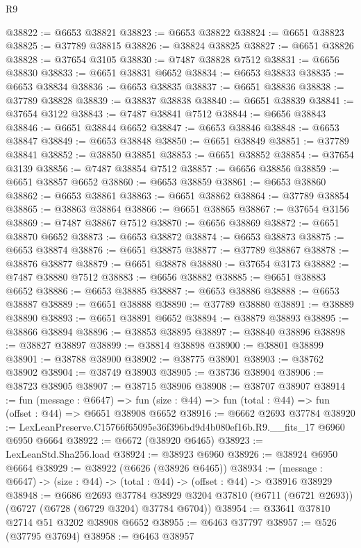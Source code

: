 \begin{lexlean}{R9}
\begin{coremodule}
@38822 := @6653 @38821
@38823 := @6653 @38822
@38824 := @6651 @38823
@38825 := @37789 @38815
@38826 := @38824 @38825
@38827 := @6651 @38826
@38828 := @37654 @3105
@38830 := @7487 @38828 @7512
@38831 := @6656 @38830
@38833 := @6651 @38831 @6652
@38834 := @6653 @38833
@38835 := @6653 @38834
@38836 := @6653 @38835
@38837 := @6651 @38836
@38838 := @37789 @38828
@38839 := @38837 @38838
@38840 := @6651 @38839
@38841 := @37654 @3122
@38843 := @7487 @38841 @7512
@38844 := @6656 @38843
@38846 := @6651 @38844 @6652
@38847 := @6653 @38846
@38848 := @6653 @38847
@38849 := @6653 @38848
@38850 := @6651 @38849
@38851 := @37789 @38841
@38852 := @38850 @38851
@38853 := @6651 @38852
@38854 := @37654 @3139
@38856 := @7487 @38854 @7512
@38857 := @6656 @38856
@38859 := @6651 @38857 @6652
@38860 := @6653 @38859
@38861 := @6653 @38860
@38862 := @6653 @38861
@38863 := @6651 @38862
@38864 := @37789 @38854
@38865 := @38863 @38864
@38866 := @6651 @38865
@38867 := @37654 @3156
@38869 := @7487 @38867 @7512
@38870 := @6656 @38869
@38872 := @6651 @38870 @6652
@38873 := @6653 @38872
@38874 := @6653 @38873
@38875 := @6653 @38874
@38876 := @6651 @38875
@38877 := @37789 @38867
@38878 := @38876 @38877
@38879 := @6651 @38878
@38880 := @37654 @3173
@38882 := @7487 @38880 @7512
@38883 := @6656 @38882
@38885 := @6651 @38883 @6652
@38886 := @6653 @38885
@38887 := @6653 @38886
@38888 := @6653 @38887
@38889 := @6651 @38888
@38890 := @37789 @38880
@38891 := @38889 @38890
@38893 := @6651 @38891 @6652
@38894 := @38879 @38893
@38895 := @38866 @38894
@38896 := @38853 @38895
@38897 := @38840 @38896
@38898 := @38827 @38897
@38899 := @38814 @38898
@38900 := @38801 @38899
@38901 := @38788 @38900
@38902 := @38775 @38901
@38903 := @38762 @38902
@38904 := @38749 @38903
@38905 := @38736 @38904
@38906 := @38723 @38905
@38907 := @38715 @38906
@38908 := @38707 @38907
@38914 := fun (message : @6647) =>
  fun (size : @44) => fun (total : @44) => fun (offset : @44) => @6651 @38908 @6652
@38916 := @6662 @2693 @37784
@38920 := LexLeanPreserve.C15766f65095e36f396bd9d4b080ef16b.R9.__fits_17 @6960 @6950 @6664
@38922 := @6672 (@38920 @6465)
@38923 := LexLeanStd.Sha256.load
@38924 := @38923 @6960
@38926 := @38924 @6950 @6664
@38929 := @38922 (@6626 (@38926 @6465))
@38934 := (message : @6647) -> (size : @44) -> (total : @44) -> (offset : @44) -> @38916 @38929
@38948 := @6686
    @2693
    @37784
    @38929
    @3204
    @37810
    (@6711 (@6721 @2693))
    (@6727 (@6728 (@6729 @3204) @37784 @6704))
@38954 := @33641 @37810 @2714 @51 @3202 @38908 @6652
@38955 := @6463 @37797
@38957 := @526 (@37795 @37694)
@38958 := @6463 @38957

\end{coremodule}
\end{lexlean}

